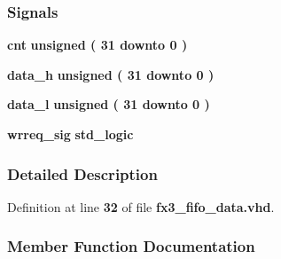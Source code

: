 \subsubsection*{Signals}
 \begin{DoxyCompactItemize}
\item 
{\bf cnt} {\bfseries \textcolor{comment}{unsigned}\textcolor{vhdlchar}{ }\textcolor{vhdlchar}{(}\textcolor{vhdlchar}{ }\textcolor{vhdlchar}{ } \textcolor{vhdldigit}{31} \textcolor{vhdlchar}{ }\textcolor{keywordflow}{downto}\textcolor{vhdlchar}{ }\textcolor{vhdlchar}{ } \textcolor{vhdldigit}{0} \textcolor{vhdlchar}{ }\textcolor{vhdlchar}{)}\textcolor{vhdlchar}{ }} 
\item 
{\bf data\+\_\+h} {\bfseries \textcolor{comment}{unsigned}\textcolor{vhdlchar}{ }\textcolor{vhdlchar}{(}\textcolor{vhdlchar}{ }\textcolor{vhdlchar}{ } \textcolor{vhdldigit}{31} \textcolor{vhdlchar}{ }\textcolor{keywordflow}{downto}\textcolor{vhdlchar}{ }\textcolor{vhdlchar}{ } \textcolor{vhdldigit}{0} \textcolor{vhdlchar}{ }\textcolor{vhdlchar}{)}\textcolor{vhdlchar}{ }} 
\item 
{\bf data\+\_\+l} {\bfseries \textcolor{comment}{unsigned}\textcolor{vhdlchar}{ }\textcolor{vhdlchar}{(}\textcolor{vhdlchar}{ }\textcolor{vhdlchar}{ } \textcolor{vhdldigit}{31} \textcolor{vhdlchar}{ }\textcolor{keywordflow}{downto}\textcolor{vhdlchar}{ }\textcolor{vhdlchar}{ } \textcolor{vhdldigit}{0} \textcolor{vhdlchar}{ }\textcolor{vhdlchar}{)}\textcolor{vhdlchar}{ }} 
\item 
{\bf wrreq\+\_\+sig} {\bfseries \textcolor{comment}{std\+\_\+logic}\textcolor{vhdlchar}{ }} 
\end{DoxyCompactItemize}


\subsubsection{Detailed Description}


Definition at line {\bf 32} of file {\bf fx3\+\_\+fifo\+\_\+data.\+vhd}.



\subsubsection{Member Function Documentation}
